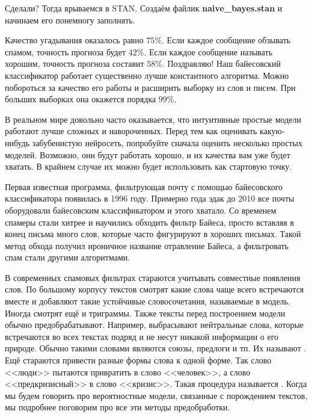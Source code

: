 Сделали? Тогда врываемся в STAN. Создаём файлик \textbf{naive\_bayes.stan} и начинаем его понемногу заполнять. 





Качество угадывания оказалось равно $75\%$. Если каждое сообщение обзывать спамом, точность прогноза будет $42\%$. Если каждое сообщение называть хорошим, точность прогноза составит $58\%$. Поздравляю! Наш байесовский классификатор работает существенно лучше константного алгоритма. Можно побороться за качество его работы и расширить выборку из слов и писем. При больших выборках она окажется порядка $99\%$. 

В реальном мире довольно часто оказывается, что интуитивные простые модели работают лучше сложных и навороченных. Перед тем как оценивать какую-нибудь забубенистую нейросеть, попробуйте сначала оценить несколько простых моделей. Возможно, они будут работать хорошо, и их качества вам уже будет хватать. В крайнем случае их можно будет использовать как стартовую точку.  

Первая известная программа, фильтрующая почту с помощью байесовского классификатора появилась в 1996 году.  Примерно года эдак до 2010 все почты оборудовали байесовским классификатором и этого хватало.  Со временем спамеры стали хитрее и научились обходить фильтр Байеса, просто вставляя в конец письма много слов, которые часто фигурируют в хороших письмах. Такой метод обхода получил ироничное название отравление Байеса, а фильтровать спам стали другими алгоритмами. 

В современных спамовых фильтрах  стараются учитывать совместные появления слов.  По большому корпусу текстов смотрят какие слова чаще всего встречаются вместе и добавляют такие устойчивые словосочетания, называемые  в модель. Иногда смотрят ещё и триграммы. Также тексты перед построением модели обычно предобрабатывают. Например, выбрасывают нейтральные слова, которые встречаются во всех текстах подряд и не несут никакой информации о его природе.  Обычно такими словами являются союзы, предлоги и тп. Их называют . Ещё стараются привести разные формы слова к одной форме. Так слово <<люди>> пытаются привратить в слово <<человек>>, а слово <<предкризисный>> в слово <<кризис>>. Такая процедура называется . Когда мы будем говорить про вероятностные модели, связанные с порождением текстов, мы подробнее поговорим про все эти методы предобработки. 



